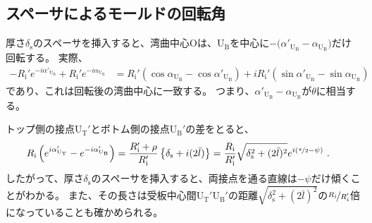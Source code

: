 \subsection{スペーサによるモールドの回転角}
厚さ$\delta_\mathrm s$のスペーサを挿入すると、湾曲中心Oは、U$_\mathrm B$を中心に$-\big(\alpha'_{\mathrm U_\mathrm B}\!-\alpha_{\mathrm U_\mathrm B}\big)$だけ回転する。
実際、
\begin{align*}
  -R_\mathrm i'e^{-i\alpha'_{\mathrm U_\mathrm B}}+R_\mathrm i'e^{-i\alpha_{\mathrm U_\mathrm B}}
  &= R_\mathrm i'(\cos\alpha_{\mathrm U_\mathrm B}-\cos\alpha'_{\mathrm U_\mathrm B})
     +iR_\mathrm i'(\sin\alpha'_{\mathrm U_\mathrm B}-\sin\alpha_{\mathrm U_\mathrm B})
\end{align*}
であり、これは回転後の湾曲中心に一致する。
つまり、$\alpha'_{\mathrm U_\mathrm B}\!-\alpha_{\mathrm U_\mathrm B}$が$\theta$に相当する。
\begin{hosoku}
トップ側の接点U$_\mathrm T'$とボトム側の接点U$_\mathrm B'$の差をとると、
\begin{align*}
  R_\mathrm i\left(e^{i\alpha_{\mathrm U_\mathrm T}'}-e^{-i\alpha'_{\mathrm U_\mathrm B}}\right)
  &= \frac{R_\mathrm i'+\rho}{R_\mathrm i'}\left\{\delta_\mathrm s+i(2\bar l)\right\}
   = \frac{R_\mathrm i}{R_\mathrm i'}\sqrt{\delta_\mathrm s^2+(2\bar l)^2}e^{i(\nicefrac\pi2-\psi)}\ .
\end{align*}
したがって、厚さ$\delta_\mathrm s$のスペーサを挿入すると、両接点を通る直線は$-\psi$だけ傾くことがわかる。
また、その長さは受板中心間U$_\mathrm T'$U$_\mathrm B'$の距離$\sqrt{\delta_\mathrm s^2+(2\bar l)^2}$の$\nicefrac{R_i}{R_i'}$倍になっていることも確かめられる。
\end{hosoku}


